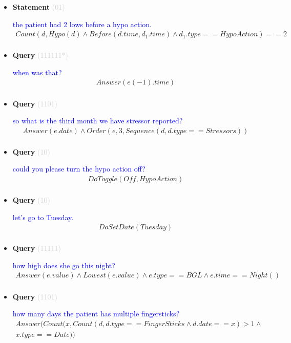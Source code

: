 \documentclass[11pt]{article}
\newcommand{\key}[1]{\textcolor{lightgray}{#1}}
\newcounter{CQuery}
\newcounter{CStatement}
\begin{document}
\begin{itemize}
\item
\textbf{Statement\theCStatement} \key{(01)} \addtocounter{CStatement}{1}
\textcolor{blue}{ the patient had 2 lows before a hypo action. }
\begin{multline*}
Count(d, Hypo(d) \wedge Before(d.time, d_1.time) \wedge d_1.type==HypoAction)==2 \\ 
\end{multline*}


\item
\textbf{Query\theCQuery} \key{(111111*)} \addtocounter{CQuery}{1}
\textcolor{blue}{ when was that? }
\begin{multline*}
Answer(e(-1).time) \\ 
\end{multline*}


\item
\textbf{Query\theCQuery} \key{(1101)} \addtocounter{CQuery}{1}
\textcolor{blue}{ so what is the third month we have stressor reported? }
\begin{multline*}
Answer(e.date) \wedge Order(e, 3, Sequence(d, d.type==Stressors)) \\ 
\end{multline*}


\item
\textbf{Query\theCQuery} \key{(10)} \addtocounter{CQuery}{1}
\textcolor{blue}{ could you please turn the hypo action off? }
\begin{multline*}
DoToggle(Off, HypoAction) \\ 
\end{multline*}


\item
\textbf{Query\theCQuery} \key{(10)} \addtocounter{CQuery}{1}
\textcolor{blue}{ let's go to Tuesday. }
\begin{multline*}
DoSetDate(Tuesday) \\ 
\end{multline*}


\item
\textbf{Query\theCQuery} \key{(11111)} \addtocounter{CQuery}{1}
\textcolor{blue}{ how high does she go this night? }
\begin{multline*}
Answer(e.value) \wedge Lowest(e.value) \wedge e.type==BGL \wedge e.time==Night() \\ 
\end{multline*}


\item
\textbf{Query\theCQuery} \key{(1101)} \addtocounter{CQuery}{1}
\textcolor{blue}{ how many days the patient has multiple fingersticks? }
\begin{multline*}
Answer(Count(x, Count(d, d.type==FingerSticks \wedge d.date==x)>1 \wedge \\ 
x.type==Date)) \\ 
\end{multline*}



\end{itemize}
\end{document}
